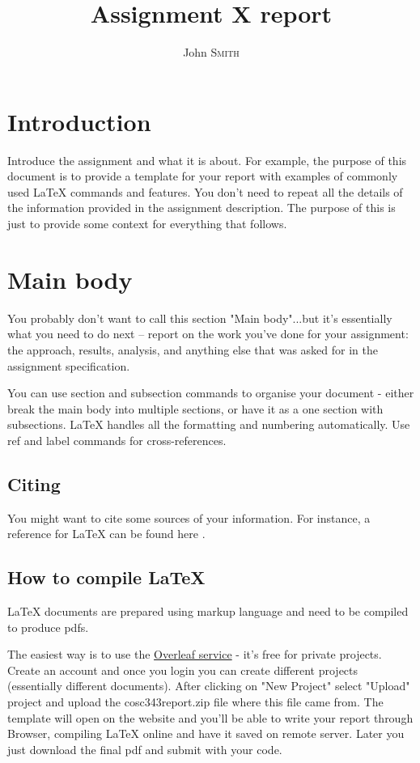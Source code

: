 \documentclass[12pt]{article}
\title{Assignment X report}
\author{John \textsc{Smith}}
\begin{document}
\maketitle


\section{Introduction}

Introduce the assignment and what it is about.  For example, the purpose of this document is to provide a template for your report with examples of commonly used \LaTeX{} commands and features.  You don't need to repeat all the details of the information provided in the assignment description.  The purpose of this is just to provide some context for everything that follows.   

\section{Main body}

You probably don't want to call this section "Main body"...but it's essentially what you need to do next --  report on the work you've done for your assignment: the approach, results, analysis, and anything else that was asked for in the assignment specification.  

You can use section and subsection commands to organise your document - either break the main body into multiple sections, or have it as a one section with subsections.   \LaTeX{} handles all the formatting and numbering automatically. Use ref and label commands for cross-references.  

\subsection{Citing}

You might want to cite some sources of your information.  For instance, a reference for \LaTeX{} can be found here \cite{latexcompanion}.

\subsection{How to compile \LaTeX{}}

\LaTeX{} documents are prepared using markup language and need to be compiled to produce pdfs.  

The easiest way is to use the \href{https://www.overleaf.com}{Overleaf service} - it's free for private projects.  Create an account and once you login you can create different projects (essentially different documents).  After clicking on "New Project" select "Upload" project and upload the cosc343report.zip file where this file came from.  The template will open on the website and you'll be able to write your report through Browser, compiling LaTeX online and have it saved on remote server.  Later you just download the final pdf and submit with your code.    
\end{document}
